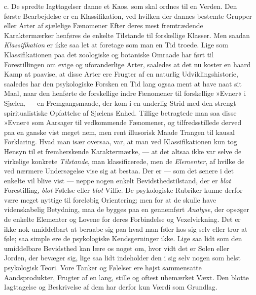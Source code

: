 \documentclass[12pt,a4paper,openany]{book}
\newcommand{\opage}[1]{\marginnote{\footnotesize\textit{[#1]}}}
\begin{document}
c. De spredte Iagttagelser danne et Kaos, som skal ordnes til en Verden.
Den første Bearbejdelse er en Klassifikation, ved hvilken der dannes
bestemte Grupper eller Arter af sjælelige Fænomener Efter deres mest
fremtrædende Karaktermærker henføres de enkelte Tilstande til
forskellige Klasser. Men saadan \emph{Klassifikation} er ikke saa let at
foretage som man en Tid troede. Lige som Klassifikationen paa det
zoologiske og botaniske Omraade har ført til Forestillingen om evige og
uforanderlige Arter, saaledes at det nu koster en haard Kamp at paavise,
at disse Arter ere Frugter af en naturlig Udviklingshistorie, saaledes
har den psykologiske Forsken en Tid lang ogsaa ment at have naat sit
Maal, naar den henførte de forskellige indre Fænomener til forskellige
»Evner« i Sjælen, --- en Fremgangsmaade, der kom i en underlig Strid med
den strengt spiritualistiske Opfattelse af Sjælens Enhed. Tillige
betragtede man saa disse »Evner« som Aarsager til vedkommende Fænomener,
og tilfredsstillede derved paa en ganske vist meget nem, men rent
illusorisk Maade Trangen til kausal
\opage{23}Forklaring. Hvad man især oversaa, var, at man ved
Klassifikationen kun tog Hensyn til et fremherskende Karaktermærke, ---
at det altsaa ikke var selve de virkelige konkrete \emph{Tilstande}, man
klassificerede, men de \emph{Elementer}, af hvilke de ved nærmere
Undersøgelse vise sig at bestaa. Der er --- som det senere i det enkelte
vil blive vist --- neppe nogen enkelt Bevidsthedstilstand, der er
\emph{blot} Forestilling, \emph{blot} Følelse eller \emph{blot} Villie.
De psykologiske Rubriker kunne derfor være meget nyttige til foreløbig
Orientering; men for at de skulle have videnskabelig Betydning, maa de
bygges paa en gennemført \emph{Analyse}, der opsøger de enkelte
Elementer og Lovene for deres Forbindelse og Vexelvirkning. Det er ikke
nok umiddelbart at beraabe sig paa hvad man føler hos sig selv eller
tror at føle; saa simple ere de psykologiske Kendsgerninger ikke. Lige
saa lidt som den umiddelbare Bevidsthed kan lære os noget om, hvor vidt
det er Solen eller Jorden, der bevæger sig, lige saa lidt indeholder den
i sig selv nogen som helst psykologisk Teori. Vore Tanker og Følelser
ere højst sammensatte Aandsprodukter, Frugter af en lang, stille og
oftest ubemærket Væxt. Den blotte Iagttagelse og Beskrivelse af dem har
derfor kun Værdi som Grundlag.
\end{document}

